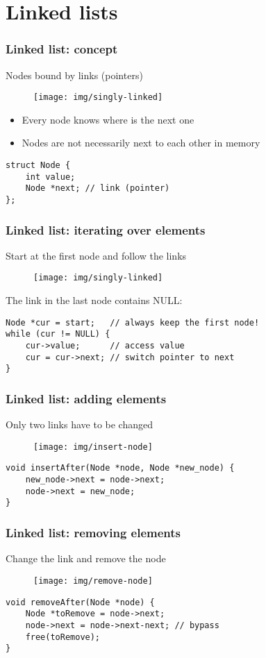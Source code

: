 \documentclass[12pt]{beamer}
\begin{document}
\section{Linked lists}

\begin{frame}[fragile]
\frametitle{Linked list: concept}
Nodes bound by links (pointers)
\begin{figure}
\centering
\texttt{[image: img/singly-linked]}
\end{figure}
\begin{itemize}
\item Every node knows where is the next one
\item Nodes are not necessarily next to each other in memory
\end{itemize}
\begin{lstlisting}
struct Node {
    int value;
    Node *next; // link (pointer)
};
\end{lstlisting}
\end{frame}

\begin{frame}[fragile]
\frametitle{Linked list: iterating over elements}
Start at the first node and follow the links
\begin{figure}
\centering
\texttt{[image: img/singly-linked]}
\end{figure}
The link in the last node contains NULL:
\begin{lstlisting}
Node *cur = start;   // always keep the first node!
while (cur != NULL) {
    cur->value;      // access value
    cur = cur->next; // switch pointer to next
}
\end{lstlisting}
\end{frame}

\begin{frame}[fragile]
\frametitle{Linked list: adding elements}
Only two links have to be changed
\begin{figure}
\centering
\texttt{[image: img/insert-node]}
\end{figure}
\begin{lstlisting}
void insertAfter(Node *node, Node *new_node) {
    new_node->next = node->next;
    node->next = new_node;
}
\end{lstlisting}
\end{frame}

\begin{frame}[fragile]
\frametitle{Linked list: removing elements}
Change the link and remove the node
\begin{figure}
\centering
\texttt{[image: img/remove-node]}
\end{figure}
\begin{lstlisting}
void removeAfter(Node *node) {
    Node *toRemove = node->next;
    node->next = node->next-next; // bypass
    free(toRemove);
}
\end{lstlisting}
\end{frame}
\end{document}
